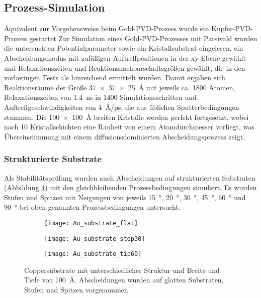 \subsection{Prozess-Simulation}

Äquivalent zur Vorgehensweise beim Gold-PVD-Prozess wurde ein Kupfer-PVD-Prozess gestartet
Zur Simulation eines Gold-PVD-Prozesses mit Parsivald wurden die untersuchten Potentialparameter sowie ein Kristallsubstrat eingelesen, ein Abscheidungsmodus mit zufälligen Auftreffpositionen in der xy-Ebene gewählt und Relaxationszeiten und Reaktionsnachbarschaftsgrößen gewählt, die in den vorheringen Tests als hinreichend ermittelt wurden.
Damit ergaben sich Reaktionsräume der Größe \SI{37x37x25}{\angstrom} mit jeweils ca. 1800 Atomen, Relaxationszeiten von \SI{1.4}{\nano\second} in \SI{1400}{} Simulationsschritten und Auftreffgeschwindigkeiten von \SI{4}{\angstrom/\pico\second}, die aus üblichen Sputterbedingungen stammen.
Die \SI{100x100}{\angstrom} breiten Kristalle werden perfekt fortgesetzt, wobei nach 10 Kristallschichten eine Rauheit von einem Atomdurchmesser vorliegt, was Übereinstimmung mit einem diffusionsdominierten Abscheidungsprozess zeigt.

\subsubsection{Strukturierte Substrate}

Als Stabilitätsprüfung wurden auch Abscheidungen auf strukturierten Substraten (Abbildung \ref{fig:coppersubstrate}) mit den gleichbleibenden Prozessbedingungen simuliert.
Es wurden Stufen und Spitzen mit Neigungen von jeweils \SI{15}{\degree}, \SI{20}{\degree}, \SI{30}{\degree}, \SI{45}{\degree}, \SI{60}{\degree} und \SI{90}{\degree} bei oben genannten Prozessbedingungen untersucht.

\begin{figure}[bt]
  \captionsetup[subfigure]{singlelinecheck=false}
  \def\subfigwidth{0.31\textwidth}
  \begin{subfigure}[t]{\subfigwidth}
    \texttt{[image: Au\_substrate\_flat]}
    \label{fig:coppersubstrate-a}
  \end{subfigure}
  \hfill
  \begin{subfigure}[t]{\subfigwidth}
    \texttt{[image: Au\_substrate\_step30]}
    \label{fig:coppersubstrate-b}
  \end{subfigure}
  \hfill
  \begin{subfigure}[t]{\subfigwidth}
    \texttt{[image: Au\_substrate\_tip60]}
    \label{fig:coppersubstrate-c}
  \end{subfigure}
  \caption[Strukturierte Coppersubstrate]{Coppersubstrate mit unterschiedlicher Struktur und Breite und Tiefe von \SI{100}{\angstrom}.
    Abscheidungen wurden auf glatten Substraten, Stufen und Spitzen vorgenommen.}
  \label{fig:coppersubstrate}
\end{figure}

